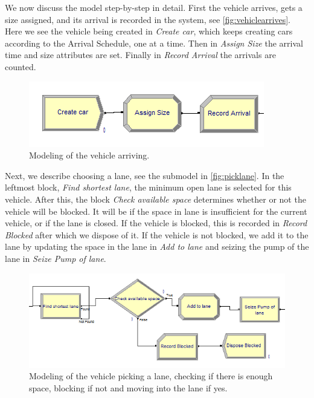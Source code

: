 We now discuss the model step-by-step in detail.
First the vehicle arrives, gets a size assigned, and its arrival is recorded in the system, see \autoref{fig:vehiclearrives}. 
Here we see the vehicle being created in \textit{Create car}, which keeps creating cars according to the Arrival Schedule, one at a time. 
Then in \textit{Assign Size} the arrival time and size attributes are set. Finally in \textit{Record Arrival} the arrivals are counted.

\begin{figure}[h]
\begin{center}
	\includegraphics[scale=1]{images/model-description/vehicle-arrives.PNG}
	\caption{Modeling of the vehicle arriving.}
	\label{fig:vehiclearrives}
\end{center}
\end{figure}

Next, we describe choosing a lane, see the submodel in \autoref{fig:picklane}. In the leftmost block, \textit{Find shortest lane}, the minimum open lane is selected for this vehicle.
 After this, the block \textit{Check available space} determines whether or not the vehicle will be blocked. 
 It will be if the space in lane is insufficient for the current vehicle, or if the lane is closed. If the vehicle is blocked, this is recorded in \textit{Record Blocked} after which we dispose of it. 
 If the vehicle is not blocked, we add it to the lane by updating the space in the lane in \textit{Add to lane} and seizing the pump of the lane in \textit{Seize Pump of lane}.

\begin{figure}[h]
\begin{center}
	\includegraphics[scale=1]{images/model-description/pick-lane.PNG}
	\caption{Modeling of the vehicle picking a lane, checking if there is enough space, blocking if not and moving into the lane if yes.}
	\label{fig:picklane}
\end{center}
\end{figure}

